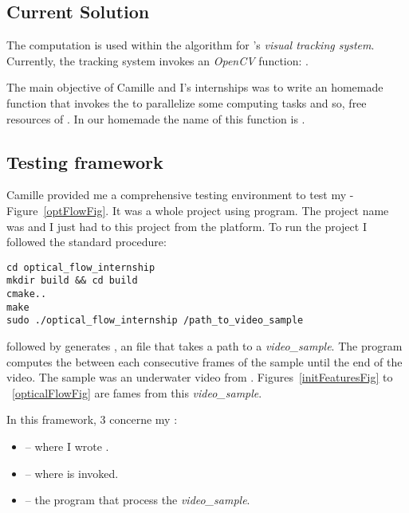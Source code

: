 \subsection{Current Solution}

The \flow{} computation is used within the  algorithm for \iBubble's \emph{visual tracking system}. Currently, the tracking system invokes an \emph{OpenCV} function: .

The main objective of Camille and I's internships was to write an homemade  function that invokes the \vc{} to parallelize some computing tasks and so, free resources of \cpu. In our homemade \api{} the name of this function is .


\subsection{Testing framework}

Camille provided me a comprehensive testing environment to test my \api{} - Figure~\ref{optFlowFig}. It was a whole  project using  program. The project name was  and I just had to  this project from the  platform. To run the project I followed the standard  procedure:


\begin{lstlisting}
cd optical_flow_internship
mkdir build && cd build
cmake..
make
sudo ./optical_flow_internship /path_to_video_sample
\end{lstlisting}


 followed by  generates , an  file that takes a path to a \emph{video\_sample}. The program computes the \flow{} between each consecutive frames of the sample until the end of the video. The sample was an underwater video from \iBubble. Figures~\ref{initFeaturesFig} to ~\ref{opticalFlowFig} are fames from this \emph{video\_sample}.

In this framework, 3  concerne my \api{}:
\begin{itemize}
	\item {} -- where I wrote .
	\item {} -- where  is invoked.
	\item {} -- the  program that process the \emph{video\_sample}.
\end{itemize}


